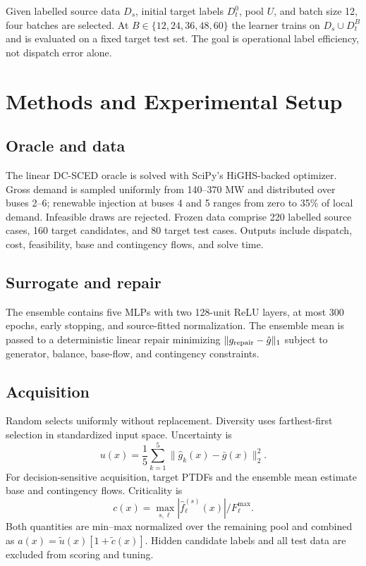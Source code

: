 \documentclass[11pt]{article}
\begin{document}
Given labelled source data $D_s$, initial target labels $D_t^0$, pool $U$, and batch size 12, four batches are selected. At $B\in\{12,24,36,48,60\}$ the learner trains on $D_s\cup D_t^B$ and is evaluated on a fixed target test set. The goal is operational label efficiency, not dispatch error alone.

\section{Methods and Experimental Setup}
\subsection{Oracle and data}
The linear DC-SCED oracle is solved with SciPy's HiGHS-backed optimizer. Gross demand is sampled uniformly from 140--370 MW and distributed over buses 2--6; renewable injection at buses 4 and 5 ranges from zero to 35\% of local demand. Infeasible draws are rejected. Frozen data comprise 220 labelled source cases, 160 target candidates, and 80 target test cases. Outputs include dispatch, cost, feasibility, base and contingency flows, and solve time.

\subsection{Surrogate and repair}
The ensemble contains five MLPs with two 128-unit ReLU layers, at most 300 epochs, early stopping, and source-fitted normalization. The ensemble mean is passed to a deterministic linear repair minimizing $\|g_{\rm repair}-\hat g\|_1$ subject to generator, balance, base-flow, and contingency constraints.

\subsection{Acquisition}
Random selects uniformly without replacement. Diversity uses farthest-first selection in standardized input space. Uncertainty is
\begin{equation}u(x)=\frac{1}{5}\sum_{k=1}^{5}\|\hat g_k(x)-\bar g(x)\|_2^2.\end{equation}
For decision-sensitive acquisition, target PTDFs and the ensemble mean estimate base and contingency flows. Criticality is
\begin{equation}c(x)=\max_{s,\ell}|\hat f_\ell^{(s)}(x)|/F_\ell^{\max}.\end{equation}
Both quantities are min--max normalized over the remaining pool and combined as $a(x)=\widetilde u(x)[1+\widetilde c(x)]$. Hidden candidate labels and all test data are excluded from scoring and tuning.
\end{document}
